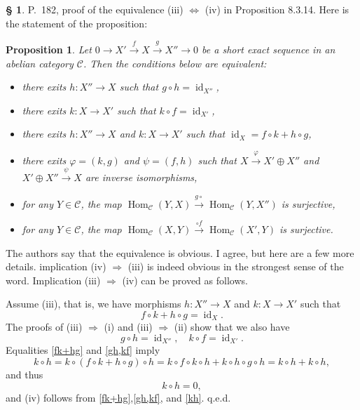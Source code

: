 \documentclass[12pt]{article}%
\newtheorem{prop}[thm]{Proposition}
\theoremstyle{remark}
\theoremstyle{definition}
\newtheorem{s}[thm]{\S}%
\newcommand{\C}{\mathcal C}
\newcommand{\pp}{\varphi}
\newcommand{\then}{\Rightarrow}
\newcommand{\ssi}{\Leftrightarrow}%
\newcommand{\xr}{\xrightarrow}
\DeclareMathOperator{\id}{id}
\DeclareMathOperator{\Hom}{Hom}%
\begin{document}
\begin{s} 
P.~182, proof of the equivalence (iii) $\ssi$ (iv) in Proposition 8.3.14. Here is the statement of the proposition:

\begin{prop}
Let $0\to X'\xr fX\xr gX''\to0$ be a short exact sequence in an abelian category $\C$. Then the conditions below are equivalent:
\begin{itemize}
\item[\em(i)] there exits $h:X''\to X$ such that $g\circ h=\id_{X''}$,
\item[\em(ii)] there exits $k:X\to X'$ such that $k\circ f=\id_{X'}$,
\item[\em(iii)] there exits $h:X''\to X$ and $k:X\to X'$ such that $\id_X=f\circ k+h\circ g$,
\item[\em(iv)] there exits $\pp=(k,g)$ and $\psi=(f,h)$ such that $X\xr\pp X'\oplus X''$ and $X'\oplus X''\xr\psi X$ are inverse isomorphisms,
\item[\em(v)] for any $Y\in\C$, the map $\Hom_\C(Y,X)\xr{g\circ}\Hom_\C(Y,X'')$ is surjective,
\item[\em(vi)] for any $Y\in\C$, the map $\Hom_\C(X,Y)\xr{\circ f}\Hom_\C(X',Y)$ is surjective.
\end{itemize}
\end{prop}

The authors say that the equivalence is obvious. I agree, but here are a few more details. implication (iv) $\then$ (iii) is indeed obvious in the strongest sense of the word. Implication (iii) $\then$ (iv) can be proved as follows. 

Assume (iii), that is, we have morphisms $h:X''\to X$ and $k:X\to X'$ such that 
\begin{equation}\label{fk+hg} 
f\circ k+h\circ g=\id_X.
\end{equation} 
The proofs of (iii) $\then$ (i) and (iii) $\then$ (ii) show that we also have 
\begin{equation}\label{gh,kf} 
g\circ h=\id_{X''},\quad k\circ f=\id_{X'}.
\end{equation} 
Equalities \eqref{fk+hg} and \eqref{gh,kf} imply 
$$
k\circ h=k\circ(f\circ k+h\circ g)\circ h=k\circ f\circ k\circ h+k\circ h\circ g\circ h=k\circ h+k\circ h,
$$ 
and thus 
\begin{equation}\label{kh} 
k\circ h=0, 
\end{equation} 
and (iv) follows from \eqref{fk+hg},\eqref{gh,kf}, and \eqref{kh}. q.e.d.
\end{s}
\end{document}
